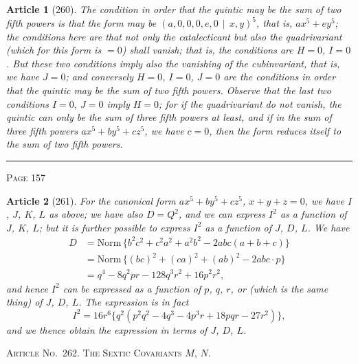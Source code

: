 \documentclass[11pt,a4paper]{article}
\theoremstyle{cayley}
\newtheorem{art}{Article}
\begin{document}
\begin{art}[260]
The condition in order that the quintic may be the sum of two fifth powers is that the form may be $(a, 0, 0, 0, e, 0 \,\mid\, x, y)^5$, that is, $ax^5 + ey^5$; the conditions here are that not only the catalecticant but also the quadrivariant (which for this form is $=0$) shall vanish; that is, the conditions are $H=0$, $I=0$. But these two conditions imply also the vanishing of the cubinvariant, that is, we have $J=0$; and conversely $H=0$, $I=0$, $J=0$ are the conditions in order that the quintic may be the sum of two fifth powers. Observe that the last two conditions $I=0$, $J=0$ imply $H=0$; for if the quadrivariant do not vanish, the quintic can only be the sum of three fifth powers at least, and if in the sum of three fifth powers $ax^5 + by^5 + cz^5$, we have $c=0$, then the form reduces itself to the sum of two fifth powers.
\end{art}

\vspace{1em}
\noindent\rule{\textwidth}{0.4pt}
\begin{center}\textsc{Page 157}\end{center}
\newpage

\begin{art}[261]
For the canonical form $ax^5 + by^5 + cz^5$, $x + y + z = 0$, we have $I$, $J$, $K$, $L$ as above; we have also $D = Q^2$, and we can express $I^2$ as a function of $J$, $K$, $L$; but it is further possible to express $I^2$ as a function of $J$, $D$, $L$. We have
\begin{align*}
D &= \text{Norm}\,\{b^2c^2 + c^2a^2 + a^2b^2 - 2abc(a+b+c)\} \\
  &= \text{Norm}\,\{(bc)^2 + (ca)^2 + (ab)^2 - 2abc\cdot p\} \\
  &= q^4 - 8q^2pr - 128q^3r^2 + 16p^2r^2,
\end{align*}
and hence $I^2$ can be expressed as a function of $p$, $q$, $r$, or (which is the same thing) of $J$, $D$, $L$. The expression is in fact
\[
I^2 = 16r^6\{q^2(p^2q^2 - 4q^3 - 4p^3r + 18pqr - 27r^2)\},
\]
and we thence obtain the expression in terms of $J$, $D$, $L$.
\end{art}

\begin{center}
\textsc{Article No.\ 262. The Sextic Covariants $M$, $N$.}
\end{center}
\end{document}
